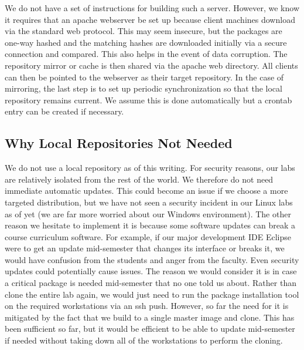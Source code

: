 We do not have a set of instructions for building such a server.  However, we know it requires that an apache webserver be set up because client machines download via the standard web protocol.  This may seem insecure, but the packages are one-way hashed and the matching hashes are downloaded initially via a secure connection and compared.  This also helps in the event of data corruption.  The repository mirror or cache is then shared via the apache web directory.  All clients can then be pointed to the webserver as their target repository.  In the case of mirroring, the last step is to set up periodic synchronization so that the local repository remains current.  We assume this is done automatically but a crontab entry can be created if necessary.

\subsection{Why Local Repositories Not Needed}
We do not use a local repository as of this writing.  For security reasons, our labs are relatively isolated from the rest of the world.  We therefore do not need immediate automatic updates.  This could become an issue if we choose a more targeted distribution, but we have not seen a security incident in our Linux labs as of yet (we are far more worried about our Windows environment).  The other reason we hesitate to implement it is because some software updates can break a course curriculum software.  For example, if our major development IDE Eclipse were to get an update mid-semester that changes its interface or breaks it, we would have confusion from the students and anger from the faculty.  Even security updates could potentially cause issues.  The reason we would consider it is in case a critical package is needed mid-semester that no one told us about.  Rather than clone the entire lab again, we would just need to run the package installation tool on the required workstations via an ssh push.  However, so far the need for it is mitigated by the fact that we build to a single master image and clone. This has been sufficient so far, but it would be efficient to be able to update mid-semester if needed without taking down all of the workstations to perform the cloning. 
